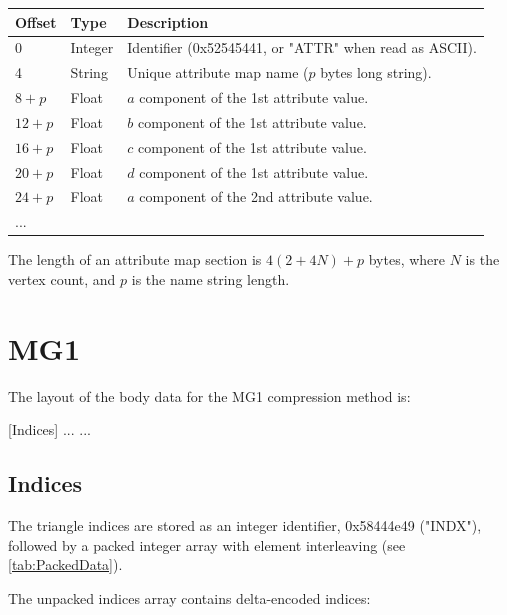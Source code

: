 \begin{tabular}{|l|l|l|}\hline
\textbf{Offset} &  \textbf{Type} & \textbf{Description}\\ \hline
0 & Integer & Identifier (0x52545441, or "ATTR" when read as ASCII).\\ \hline
4 & String & Unique attribute map name ($p$ bytes long string).\\ \hline
$8+p$ & Float & $a$ component of the 1st attribute value.\\ \hline
$12+p$ & Float & $b$ component of the 1st attribute value.\\ \hline
$16+p$ & Float & $c$ component of the 1st attribute value.\\ \hline
$20+p$ & Float & $d$ component of the 1st attribute value.\\ \hline
$24+p$ & Float & $a$ component of the 2nd attribute value.\\ \hline
... & & \\ \hline
\end{tabular}

The length of an attribute map section is $4(2+4N)+p$ bytes, where $N$ is the vertex
count, and $p$ is the name string length.


\section{MG1}
The layout of the body data for the MG1 compression method is:

[Indices]\newline
[Vertices]\newline
[Normals]\newline
[UV map 0]\newline
[UV map 1]\newline
...\newline
[UV map N]\newline
...

\subsection{Indices}
The triangle indices are stored as an integer identifier, 0x58444e49 ("INDX"),
followed by a packed integer array with element interleaving (see
\ref{tab:PackedData}).

The unpacked indices array contains delta-encoded indices:

